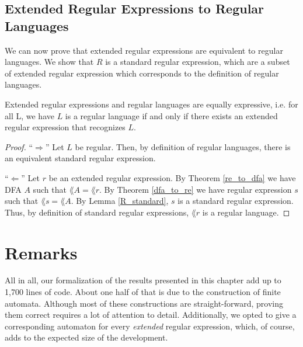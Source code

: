 \subsection{Extended Regular Expressions to Regular Languages}

We can now prove that extended regular expressions are equivalent to regular languages.
We show that $R$ is a standard regular expression, which are a subset of extended regular expression which corresponds
to the definition of regular languages.


\begin{theorem}
    \label{ext_re_to_reg_lang}
    Extended regular expressions and regular languages are equally expressive, i.e.
    for all L, we have $L$ is a regular language if and only if there exists an extended regular expression that recognizes $L$.
\end{theorem}
\begin{proof}
    ``$\Rightarrow$'' Let $L$ be regular. 
    Then, by definition of regular languages, there is an equivalent standard regular expression.

    ``$\Leftarrow$'' Let $r$ be an extended regular expression. 
    By Theorem \ref{re_to_dfa} we have DFA $A$ such that $\lang{A} = \lang{r}$.
    By Theorem \ref{dfa_to_re} we have regular expression $s$ such that $\lang{s} = \lang{A}$.
    By Lemma \ref{R_standard}, $s$ is a standard regular expression.
    Thus, by definition of standard regular expressions, $\lang{r}$ is a regular language.
\end{proof}


\section*{Remarks}

All in all, our formalization of the results presented in this chapter add up to 1,700 lines of code.
About one half of that is due to the construction of finite automata. 
Although most of these constructions are straight-forward, proving them correct requires a lot of attention to detail.
Additionally, we opted to give a corresponding automaton for every \textit{extended} regular expression, which, 
of course, adds to the expected size of the development.
